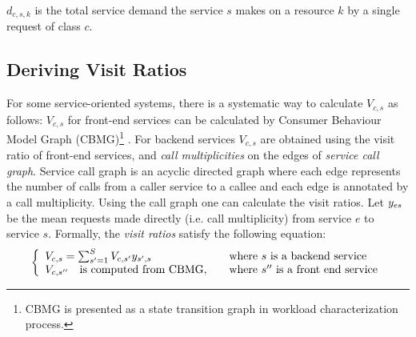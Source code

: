   $d_{c,s,k}$ is the total service demand the service $s$ makes on a resource $k$
  by a single request of class $c$. 
 \subsection{Deriving Visit Ratios}    
 For some service-oriented systems, there is a systematic way to calculate  $V_{c,s}$ as follows: $V_{c,s}$ for front-end services can be calculated by Consumer Behaviour Model Graph (CBMG)\footnote{CBMG is presented as a state transition graph in workload characterization process.}  \cite{menasce2004composing}. 
    For backend services  $V_{c,s}$ are obtained using the visit ratio of front-end services, and \textit{call multiplicities}  on the edges of \textit{service call graph}. 
      Service call graph is an acyclic directed graph where each edge represents the number of calls from a caller service to a callee and each edge is annotated by a call multiplicity. 
Using the call graph one can calculate the visit ratios.
Let $y_{es}$ be the mean requests made directly (i.e. call multiplicity) from service $e$ to service $s$. 
 Formally, the \textit{visit ratios} satisfy the following equation:  
\[  \left\{ 
  \begin{array}{l l}
   V_{c,s}=\sum_{s'=1}^{S} V_{c,s'} y_{s',s} & \quad \text{where $s$ is a backend service}\\
    V_{c,s''}  \quad \text{is computed from CBMG}, & \quad  \text{where $s''$ is a front end service}
  \end{array} \right.\]

